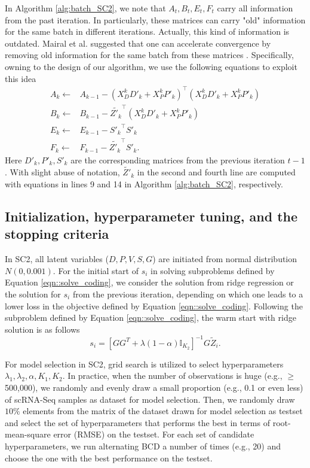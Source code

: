 \documentclass[12pt]{article}
\begin{document}
    In Algorithm \ref{alg:batch_SC2}, we note that $A_t, B_t, E_t, F_t$ carry all information from the past iteration. In particularly, these matrices can carry  "old" information for the same batch in different iterations. Actually, this kind of information is outdated. Mairal et al. suggested that one can accelerate convergence by removing old information for the same batch from these matrices \cite{mairal2009online}. Specifically, owning to the design of our algorithm, we use the following equations to exploit this idea
    \begin{equation}
      \label{eqn::sc_removing_old_info}
      \begin{split}
        A_k \leftarrow & A_{k-1} - (X_D^k D'_k + X_P^k P'_k)^\intercal (X_D^k D'_k + X_P^k P'_k) \\
        B_k \leftarrow & B_{k-1} - \tilde{Z'_k}^\intercal (X_D^k D'_k + X_P^k P'_k) \\
        E_k \leftarrow & E_{k-1} - {S'_k}^\intercal S'_k \\
        F_k \leftarrow & F_{k-1} - \tilde{Z'_k}^\intercal S'_k.
      \end{split}
    \end{equation}
    Here $D'_k, P'_k, S'_k$ are the corresponding matrices from the previous iteration $t-1$. With slight abuse of notation, ${\tilde{Z'}_k}$ in the second and fourth line are computed with equations in lines 9 and 14 in Algorithm \ref{alg:batch_SC2}, respectively.
    
  
  \subsection{Initialization, hyperparameter tuning, and the stopping criteria}
    In SC2, all latent variables ($D, P, V, S, G$) are initiated from normal distribution $N(0, 0.001)$. For the initial start of $s_i$ in solving subproblems defined by Equation \ref{eqn::solve_coding}, we consider the solution from ridge regression or the solution for $s_i$  from the previous iteration, depending on which one leads to a lower loss in the objective defined by Equation \ref{eqn::solve_coding}. Following the subproblem defined by Equation \ref{eqn::solve_coding}, the warm start with ridge solution is as follows
    \begin{equation*}
      s_i = [G G^T + \lambda (1 - \alpha) \mathbb{I}_{K_2} ]^{-1} G \tilde{Z}_i.
    \end{equation*}

    For model selection in SC2, grid search is utilized to select hyperparameters $\lambda_1, \lambda_2, \alpha, K_1, K_2$. In practice, when the number of observations is huge (e.g., $\geq$ 500,000), we randomly and evenly draw a small proportion (e.g., 0.1 or even less) of scRNA-Seq samples as dataset for model selection. Then, we randomly draw $10\%$ elements from the matrix of the dataset drawn for model selection as testset and select the set of hyperparameters that performs the best in terms of root-mean-square error (RMSE) on the testset. For each set of candidate hyperparameters, we run alternating BCD a number of times (e.g., 20) and choose the one with the best performance on the testset. 
\end{document}
